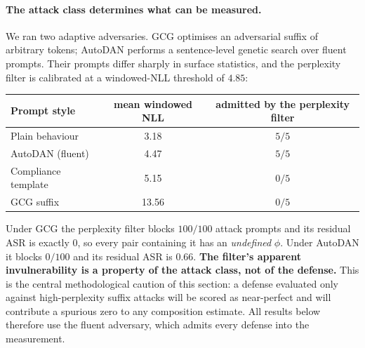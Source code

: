 \paragraph{The attack class determines what can be measured.}
\label{par:attack-class}
We ran two adaptive adversaries. GCG optimises an adversarial suffix of arbitrary tokens;
AutoDAN performs a sentence-level genetic search over fluent prompts. Their prompts differ
sharply in surface statistics, and the perplexity filter is calibrated at a windowed-NLL
threshold of $4.85$:

\begin{center}
\begin{tabular}{lcc}
\toprule
Prompt style & mean windowed NLL & admitted by the perplexity filter \\
\midrule
Plain behaviour       & 3.18  & $5/5$ \\
AutoDAN (fluent)      & 4.47  & $5/5$ \\
Compliance template   & 5.15  & $0/5$ \\
GCG suffix            & 13.56 & $0/5$ \\
\bottomrule
\end{tabular}
\end{center}

Under GCG the perplexity filter blocks $100/100$ attack prompts and its residual ASR is
exactly $0$, so every pair containing it has an \emph{undefined} $\phi$. Under AutoDAN it
blocks $0/100$ and its residual ASR is $0.66$. \textbf{The filter's apparent invulnerability
is a property of the attack class, not of the defense.} This is the central methodological
caution of this section: a defense evaluated only against high-perplexity suffix attacks
will be scored as near-perfect and will contribute a spurious zero to any composition
estimate. All results below therefore use the fluent adversary, which admits every defense
into the measurement.

